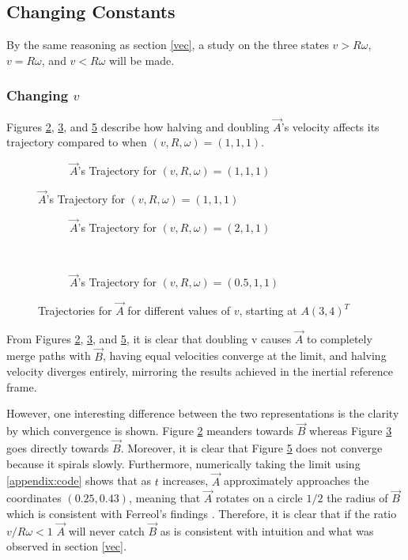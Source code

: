 \documentclass[pstricks, border=12pt]{article}
\begin{document}
\subsection{Changing Constants}
By the same reasoning as section \ref{vec}, a study on the three states $v > R\omega$, $v = R\omega$, and $v < R\omega$ will be made.
 \subsubsection{Changing $v$}

 Figures \ref{relv1}, \ref{relv2}, and \ref{relv3} describe how halving and doubling $\Vec{A}$'s velocity affects its trajectory compared to when $(v, R, \omega) = (1, 1, 1)$.
\newpage
 \begin{figure}[tbh]
    \centering
    \begin{subfigure}[t]{0.5\linewidth}
         \centering
         
         \caption{$\vec A$'s Trajectory for $(v, R, \omega) = (1, 1, 1)$}
         \label{relv1}
    \end{subfigure}
\end{figure}
\begin{figure}[tbh]\ContinuedFloat
    \centering
    \begin{subfigure}[t]{0.5\linewidth}
         \centering
         
         \caption{$\vec A$'s Trajectory for $(v, R, \omega) = (2, 1, 1)$}
         \label{relv2}
    \end{subfigure}%
    ~ 
    \begin{subfigure}[t]{0.5\linewidth}
         \centering
         
         \caption{$\vec A$'s Trajectory for $(v, R, \omega) = (0.5, 1, 1)$}
         \label{relv3}
    \end{subfigure}
    \caption{Trajectories for $\vec A$ for different values of $v$, starting at $A(3, 4)^T$}
\end{figure}

From Figures \ref{relv1}, \ref{relv2}, and \ref{relv3}, it is clear that doubling v causes $\Vec{A}$ to completely merge paths with $\Vec{B}$, having equal velocities converge at the limit, and halving velocity diverges entirely, mirroring the results achieved in the inertial reference frame.

However, one interesting difference between the two representations is the clarity by which convergence is shown. Figure \ref{relv1} meanders towards $\Vec{B}$ whereas Figure \ref{relv2} goes directly towards $\Vec{B}$. Moreover, it is clear that Figure \ref{relv3} does not converge because it spirals slowly. Furthermore, numerically taking the limit using \ref{appendix:code} shows that as $t$ increases, $\Vec{A}$ approximately approaches the coordinates $(0.25, 0.43)$, meaning that $\vec A$ rotates on a circle $1/2$ the radius of $\vec B$ which is consistent with Ferreol's findings \cite{ferreol_2017}. Therefore, it is clear that if the ratio $v/R\omega < 1$ $\Vec{A}$ will never catch $\Vec{B}$ as is consistent with intuition and what was observed in section \ref{vec}.
\end{document}
